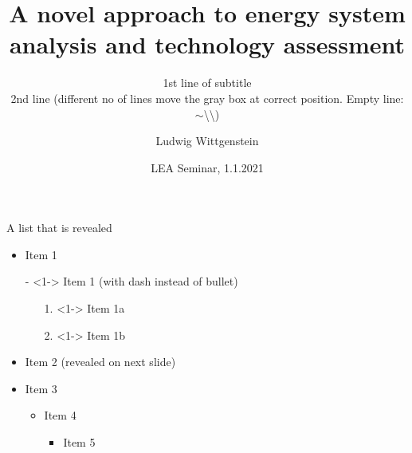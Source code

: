 \documentclass[aspectratio=169]{beamer}
\begin{document}
\title{A novel approach to energy system analysis and technology assessment}

\author[L.~Wittgenstein]{Ludwig Wittgenstein}


\subtitle{1st line of subtitle\\2nd line (different no of lines move the gray box at correct position. Empty line:  $\sim$\textbackslash\textbackslash)}

\date{LEA Seminar, 1.1.2021} %


\begin{frame}[plain] %
  \titlepage
\end{frame}


\begin{frame}{A list that is revealed}  
  \begin{itemize}
  \item<1-> Item 1
  \item[-]<1->  Item 1 (with dash instead of bullet)
    \begin{itemize}
    \item[1.]<1-> Item 1a
    \item[2.]<1-> Item 1b
    \end{itemize}
  \item<2->  Item 2 (revealed on next slide)
  \item<3-> Item 3
    \begin{itemize}
    \item<3-> Item 4
      \begin{itemize}
      \item<3-> Item 5
      \end{itemize}
    \end{itemize}
  \end{itemize}
 \vspace*{\fill} %
\end{frame}
\end{document}
